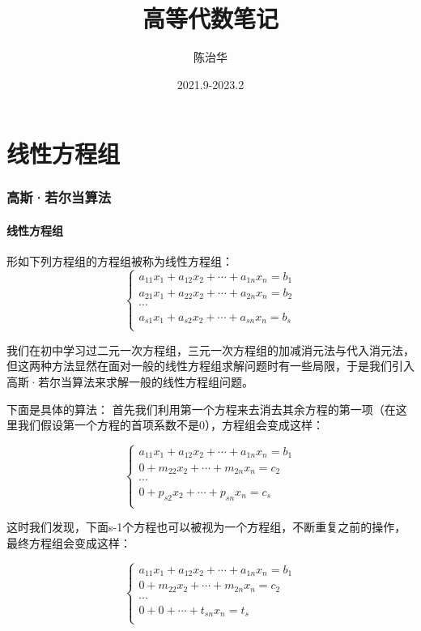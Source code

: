 \documentclass[a4paper]{ctexart}
\title{高等代数笔记}
\date{2021.9-2023.2}
\author{陈治华}
\begin{document}
\maketitle

\newpage
\tableofcontents
\thispagestyle{empty}
\newpage
{}

\newpage
\part{线性方程组}
\section{高斯·若尔当算法}
\subsection{线性方程组}
形如下列方程组的方程组被称为线性方程组：
$$
\begin{cases}
a_{11}x_{1}+a_{12}x_{2}+\cdots+a_{1n}x_{n}=b_{1}\\
a_{21}x_{1}+a_{22}x_{2}+\cdots+a_{2n}x_{n}=b_{2}\\
\cdots\\
a_{s1}x_{1}+a_{s2}x_{2}+\cdots+a_{sn}x_{n}=b_{s}\\
\end{cases}
$$

我们在初中学习过二元一次方程组，三元一次方程组的加减消元法与代入消元法，但这两种方法显然在面对一般的线性方程组求解问题时有一些局限，于是我们引入高斯·若尔当算法来求解一般的线性方程组问题。

下面是具体的算法：
首先我们利用第一个方程来去消去其余方程的第一项（在这里我们假设第一个方程的首项系数不是0），方程组会变成这样：

$$
\begin{cases}
a_{11}x_{1}+a_{12}x_{2}+\cdots+a_{1n}x_{n}=b_{1}\\
0+m_{22}x_{2}+\cdots+m_{2n}x_{n}=c_{2}\\
\cdots\\
0+p_{s2}x_{2}+\cdots+p_{sn}x_{n}=c_{s}\\
\end{cases}
$$

这时我们发现，下面s-1个方程也可以被视为一个方程组，不断重复之前的操作，最终方程组会变成这样：

$$
\begin{cases}
a_{11}x_{1}+a_{12}x_{2}+\cdots+a_{1n}x_{n}=b_{1}\\
0+m_{22}x_{2}+\cdots+m_{2n}x_{n}=c_{2}\\
\cdots\\
0+0+\cdots+t_{sn}x_{n}=t_{s}\\
\end{cases}
$$
\end{document}
